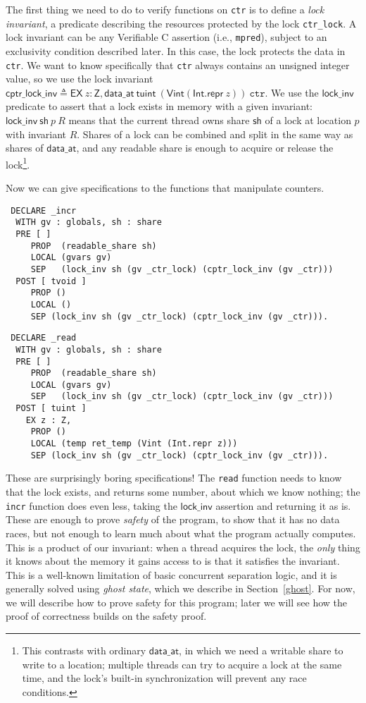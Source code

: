 \documentclass[11pt]{article}
\begin{document}
The first thing we need to do to verify functions on \texttt{ctr} is to define a \emph{lock invariant}, a predicate describing the resources protected by the lock \texttt{ctr\_lock}. A lock invariant can be any Verifiable C assertion (i.e., \texttt{mpred}), subject to an exclusivity condition described later. In this case, the lock protects the data in \texttt{ctr}. We want to know specifically that \texttt{ctr} always contains an unsigned integer value, so we use the lock invariant $\mathsf{cptr\_lock\_inv} \triangleq \mathsf{EX}\ z : \mathsf{Z}, \mathsf{data\_at}\ \mathsf{tuint}\ (\mathsf{Vint} (\mathsf{Int.repr}\ z))\ \texttt{ctr}$. We use the $\mathsf{lock\_inv}$ predicate to assert that a lock exists in memory with a given invariant: $\mathsf{lock\_inv}\ \mathsf{sh}\ p\ R$ means that the current thread owns share $\mathsf{sh}$ of a lock at location $p$ with invariant $R$. Shares of a lock can be combined and split in the same way as shares of $\mathsf{data\_at}$, and any readable share is enough to acquire or release the lock\footnote{This contrasts with ordinary $\mathsf{data\_at}$, in which we need a writable share to write to a location; multiple threads can try to acquire a lock at the same time, and the lock's built-in synchronization will prevent any race conditions.}.

Now we can give specifications to the functions that manipulate counters.
\begin{verbatim}
 DECLARE _incr
  WITH gv : globals, sh : share
  PRE [ ]
     PROP  (readable_share sh)
     LOCAL (gvars gv)
     SEP   (lock_inv sh (gv _ctr_lock) (cptr_lock_inv (gv _ctr)))
  POST [ tvoid ]
     PROP ()
     LOCAL ()
     SEP (lock_inv sh (gv _ctr_lock) (cptr_lock_inv (gv _ctr))).
\end{verbatim}

\begin{verbatim}
 DECLARE _read
  WITH gv : globals, sh : share
  PRE [ ]
     PROP  (readable_share sh)
     LOCAL (gvars gv)
     SEP   (lock_inv sh (gv _ctr_lock) (cptr_lock_inv (gv _ctr)))
  POST [ tuint ]
    EX z : Z,
     PROP ()
     LOCAL (temp ret_temp (Vint (Int.repr z)))
     SEP (lock_inv sh (gv _ctr_lock) (cptr_lock_inv (gv _ctr))).
\end{verbatim}
These are surprisingly boring specifications! The \texttt{read} function needs to know that the lock exists, and returns some number, about which we know nothing; the \texttt{incr} function does even less, taking the $\mathsf{lock\_inv}$ assertion and returning it as is. These are enough to prove \emph{safety} of the program, to show that it has no data races, but not enough to learn much about what the program actually computes. This is a product of our invariant: when a thread acquires the lock, the \emph{only} thing it knows about the memory it gains access to is that it satisfies the invariant. This is a well-known limitation of basic concurrent separation logic, and it is generally solved using \emph{ghost state}, which we describe in Section~\ref{ghost}. For now, we will describe how to prove safety for this program; later we will see how the proof of correctness builds on the safety proof.
\end{document}
